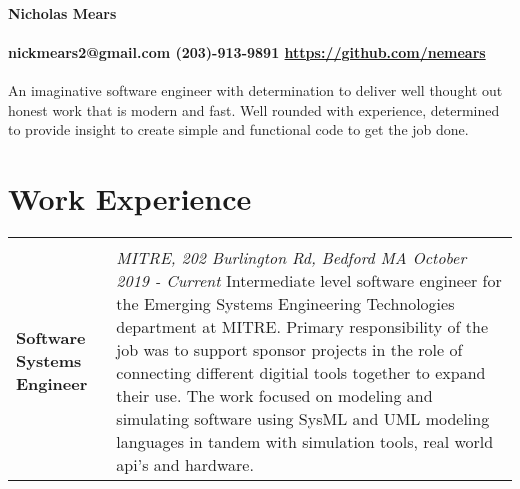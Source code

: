 \documentclass[10pt]{article}
\begin{document}
\paragraph{\centering \huge Nicholas Mears \\ }
\paragraph{\centering nickmears2@gmail.com (203)-913-9891 \url{https://github.com/nemears}\\}

An imaginative software engineer with determination to deliver well thought out honest work that is modern and fast. Well rounded with experience, determined to provide insight to create simple and functional code to get the job done.

\section*{Work Experience}
\begin{tabular}[t]{p{4cm} p{14cm}}
  \hline \\
    \raggedright
    \large \textbf{Software Systems Engineer} &
    \textit{MITRE, 202 Burlington Rd, Bedford MA \hfill October 2019 - Current} \newline
	  Intermediate level software engineer for the Emerging Systems Engineering Technologies department at MITRE. Primary responsibility of the job was to support sponsor projects in the role of connecting different digitial tools together to expand their use. The work focused on modeling and simulating software using SysML and UML modeling languages in tandem with simulation tools, real world api's and hardware.
\end{tabular}

\end{document}
